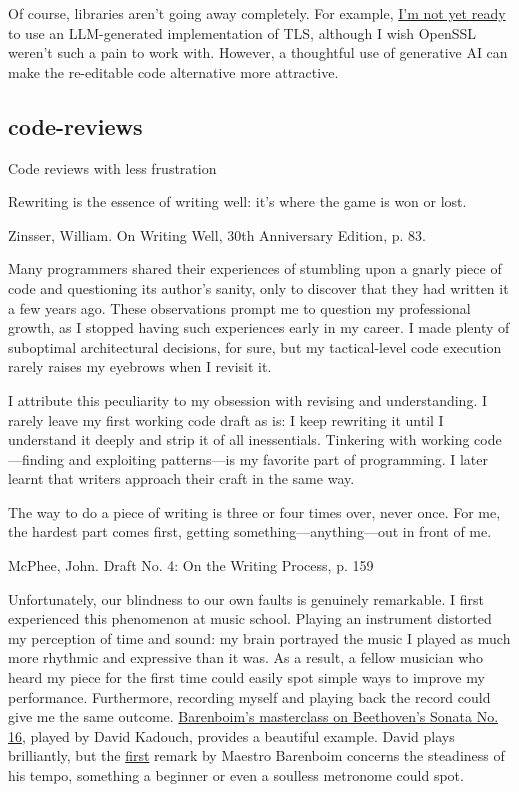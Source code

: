 \documentclass{article}
\begin{document}
Of course, libraries aren’t going away completely.
For example, \href{https://security.stackexchange.com/questions/18197/why-shouldnt-we-roll-our-own#18198}{I’m not yet ready} to use an LLM-generated implementation of TLS,
although I wish OpenSSL weren’t such a pain to work with.
However, a thoughtful use of generative AI can make the re-editable code alternative more attractive.

\subsection{code-reviews}{Code reviews with less frustration}
\epigraph{
  Rewriting is the essence of writing well: it’s where the game is won or lost.
}{
  Zinsser, William. On Writing Well, 30th Anniversary Edition, p. 83.
}

Many programmers shared their experiences of stumbling upon a gnarly piece of code and questioning its author's sanity,
only to discover that they had written it a few years ago.
These observations prompt me to question my professional growth, as I stopped having such experiences early in my career.
I made plenty of suboptimal architectural decisions, for sure, but my tactical-level code execution rarely raises my eyebrows when I revisit it.

I attribute this peculiarity to my obsession with revising and understanding.
I rarely leave my first working code draft as is: I keep rewriting it until I understand it deeply and strip it of all inessentials.
Tinkering with working code—finding and exploiting patterns—is my favorite part of programming.
I later learnt that writers approach their craft in the same way.

\epigraph{
  The way to do a piece of writing is three or four times over, never once. For me, the hardest part comes first, getting something—anything—out in front of me.
}{McPhee, John. Draft No. 4: On the Writing Process, p. 159}

Unfortunately, our blindness to our own faults is genuinely remarkable.
I first experienced this phenomenon at music school.
Playing an instrument distorted my perception of time and sound: my brain portrayed the music I played as much more rhythmic and expressive than it was.
As a result, a fellow musician who heard my piece for the first time could easily spot simple ways to improve my performance.
Furthermore, recording myself and playing back the record could give me the same outcome.
\href{https://youtu.be/CwebNT9AMiA?si=_2BljVfI_ArgxRrF}{Barenboim’s masterclass on Beethoven's Sonata No. 16}, played by David Kadouch, provides a beautiful example.
David plays brilliantly, but the \href{https://youtu.be/CwebNT9AMiA?si=bUYR5Vswf-44dpik&t=480}{first} remark by Maestro Barenboim concerns the steadiness of his tempo,
something a beginner or even a soulless metronome could spot.
\end{document}
